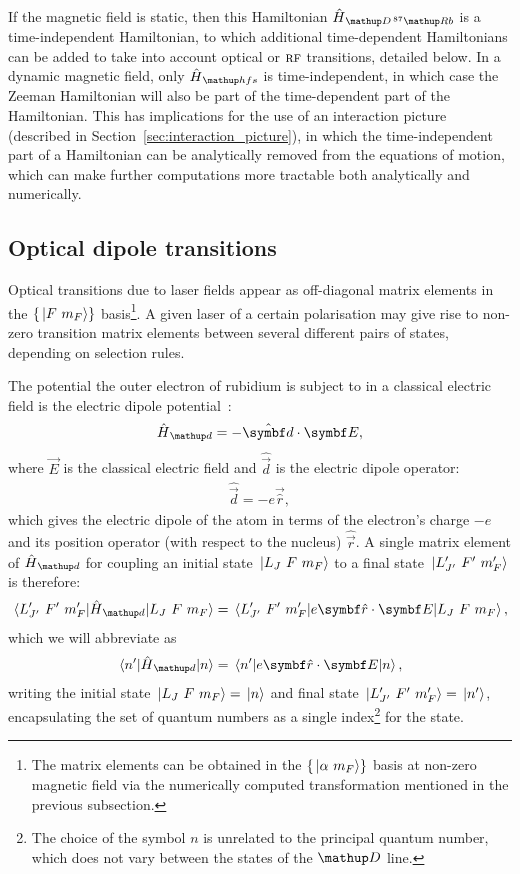 If the magnetic field is static, then this Hamiltonian $\hat{H}_{\up{D}\,^{87}\up{Rb}}$ is a time-independent Hamiltonian, to which additional time-dependent Hamiltonians can be added to take into account optical or $\textsc{rf}$ transitions, detailed below. In a dynamic magnetic field, only $\hat H_\up{hfs}$ is time-independent, in which case the Zeeman Hamiltonian will also be part of the time-dependent part of the Hamiltonian. This has implications for the use of an interaction picture (described in Section~\ref{sec:interaction_picture}), in which the time-independent part of a Hamiltonian can be analytically removed from the equations of motion, which can make further computations more tractable both analytically and numerically.

\subsection{Optical dipole transitions}\label{sec:optical_dipole_transitions}

Optical transitions due to laser fields appear as off-diagonal matrix elements in the $\{\ket{F\ m_F}\}$ basis\footnote{The matrix elements can be obtained in the $\{\ket{\alpha\ m_F}\}$ basis at non-zero magnetic field via the numerically computed transformation mentioned in the previous subsection.}. A given laser of a certain polarisation may give rise to non-zero transition matrix elements between several different pairs of states, depending on selection rules.

The potential the outer electron of rubidium is subject to in a classical electric field is the electric dipole potential~\cite{metcalf_laser_1999, steck_quantum_2017}:
\begin{align}
\hat H_\up{d} = -\hat{\vec d}\cdot\vec E,
\end{align}
where $\vec E$ is the classical electric field and $\hat{\vec d}$ is the electric dipole operator:
\begin{align}
\hat{\vec d} = -e\vec{\hat r},
\end{align}
which gives the electric dipole of the atom in terms of the electron's charge $-e$ and its position operator (with respect to the nucleus) $\hat{\vec r}$. A single matrix element of $\hat H_\up{d}$ for coupling an initial state $\ket{L_J\ F\ m_F}$ to a final state $\ket{L^\prime_{J^\prime}\ F^\prime\ m_F^\prime}$ is therefore:
\begin{align}\label{eq:electric_dipole_potential}
\matrixel{L^\prime_{J^\prime}\ F^\prime\ m_F^\prime}{\hat H_\up{d}}{L_J\ F\ m_F} = 
\matrixel{L^\prime_{J^\prime}\ F^\prime\ m_F^\prime}{e\vec{\hat r}\cdot\vec E}{L_J\ F\ m_F},
\end{align}
which we will abbreviate as
\begin{align}
\matrixel{n^\prime}{\hat H_\up{d}}{n} = 
\matrixel{n^\prime}{e\vec{\hat r}\cdot\vec E}{n},
\end{align}
writing the initial state $\ket{L_J\ F\ m_F}=\ket{n}$ and final state $\ket{L^\prime_{J^\prime}\ F^\prime\ m_F^\prime}=\ket{n^\prime}$, encapsulating the set of quantum numbers as a single index\footnote{The choice of the symbol $n$ is unrelated to the principal quantum number, which does not vary between the states of the $\up{D}$ line.} for the state.

